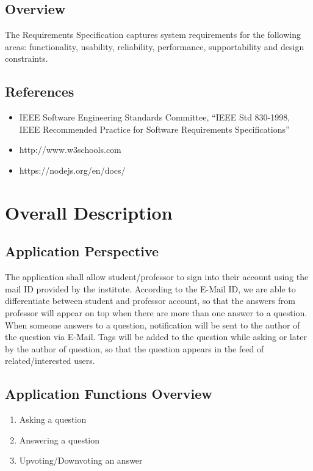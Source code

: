 \documentclass[journal,12pt,onecolumn,draftclsnofoot,]{IEEEtran}
\begin{document}
\subsection{Overview}

The Requirements Specification captures system requirements for the following areas: functionality,
usability, reliability, performance, supportability and design constraints.

\subsection{References}
\begin{itemize}
\item IEEE Software Engineering Standards Committee, “IEEE Std 830-1998, IEEE Recommended Practice for Software Requirements Specifications”
\item http://www.w3schools.com
\item https://nodejs.org/en/docs/
\end{itemize}

\section{Overall Description}

\subsection{Application Perspective}
The application shall allow student/professor to sign into their account using the mail ID provided by the institute. According to the E-Mail ID, we are able to differentiate between student and professor account, so that the answers from professor will appear on top when there are more than one answer to a question. When someone answers to a question, notification will be sent to the author of the question via E-Mail. Tags will be added to the question while asking or later by the author of question, so that the question appears in the feed of related/interested users. 

\subsection{Application Functions Overview}

\begin{enumerate}
\item Asking a question
\item Answering a question
\item Upvoting/Downvoting an answer
\end{enumerate} 
\end{document}

